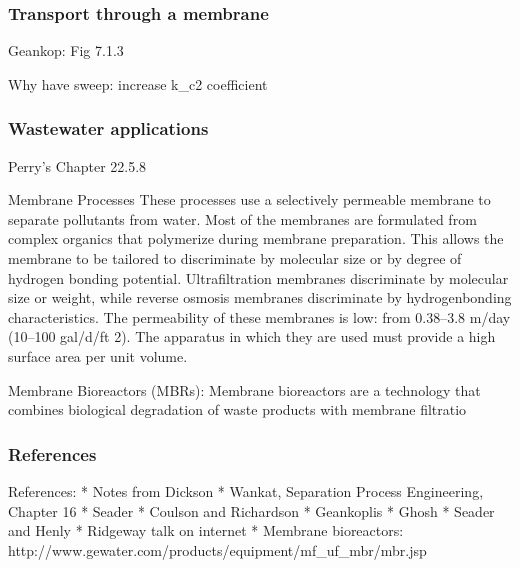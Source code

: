 \begin{frame}\frametitle{Transport through a membrane}
	Geankop: Fig 7.1.3 
	
	Why have sweep: increase k_c2 coefficient
\end{frame}



\begin{frame}\frametitle{Wastewater applications}
	Perry's Chapter 22.5.8
	
	Membrane Processes These processes use a selectively permeable membrane to separate pollutants from water. Most of the membranes are formulated from complex organics that polymerize during membrane preparation. This allows the membrane to be tailored to discriminate by molecular size or by degree of hydrogen bonding potential. Ultrafiltration membranes discriminate by molecular size or weight, while reverse osmosis membranes discriminate by hydrogenbonding characteristics. The permeability of these membranes is low: from 0.38–3.8 m/day (10–100 gal/d/ft 2). The apparatus in which they are used must provide a high surface area per unit volume.

	Membrane Bioreactors (MBRs): Membrane bioreactors are a technology that combines biological degradation of waste products with membrane filtratio
\end{frame}

\begin{frame}\frametitle{References}
	References:
	* Notes from Dickson
	* Wankat, Separation Process Engineering, Chapter 16
	* Seader
	* Coulson and Richardson
	* Geankoplis
	* Ghosh
	* Seader and Henly
	* Ridgeway talk on internet
	* Membrane bioreactors: http://www.gewater.com/products/equipment/mf_uf_mbr/mbr.jsp
	
\end{frame}